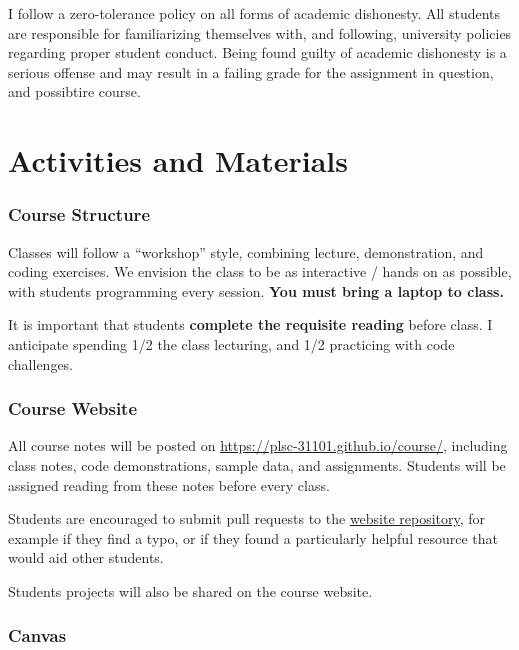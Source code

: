\documentclass[]{book}
\begin{document}
I follow a zero-tolerance policy on all forms of academic dishonesty. All students are responsible for familiarizing themselves with, and following, university policies regarding proper student conduct. Being found guilty of academic dishonesty is a serious offense and may result in a failing grade for the assignment in question, and possibtire course.

\hypertarget{activities-and-materials}{%
\section{Activities and Materials}\label{activities-and-materials}}

\hypertarget{course-structure}{%
\subsubsection*{Course Structure}\label{course-structure}}

Classes will follow a ``workshop'' style, combining lecture, demonstration, and coding exercises. We envision the class to be as interactive / hands on as possible, with students programming every session. \textbf{You must bring a laptop to class.}

It is important that students \textbf{complete the requisite reading} before class. I anticipate spending 1/2 the class lecturing, and 1/2 practicing with code challenges.

\hypertarget{course-website}{%
\subsubsection*{Course Website}\label{course-website}}

All course notes will be posted on \url{https://plsc-31101.github.io/course/}, including class notes, code demonstrations, sample data, and assignments. Students will be assigned reading from these notes before every class.

Students are encouraged to submit pull requests to the \href{https://github.com/plsc-31101/course/}{website repository}, for example if they find a typo, or if they found a particularly helpful resource that would aid other students.

Students projects will also be shared on the course website.

\hypertarget{canvas}{%
\subsubsection*{Canvas}\label{canvas}}
\end{document}
